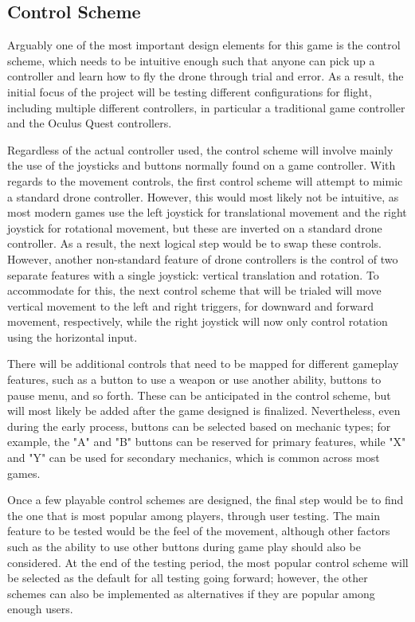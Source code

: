 \documentclass[10pt,twocolumn]{article}
\begin{document}
\subsection{Control Scheme}

Arguably one of the most important design elements for this game is the control scheme, which needs to be intuitive enough such that anyone can pick up a controller and learn how to fly the drone through trial and error. As a result, the initial focus of the project will be testing different configurations for flight, including multiple different controllers, in particular a traditional game controller and the Oculus Quest controllers. 

Regardless of the actual controller used, the control scheme will involve mainly the use of the joysticks and buttons normally found on a game controller. With regards to the movement controls, the first control scheme will attempt to mimic a standard drone controller. However, this would most likely not be intuitive, as most modern games use the left joystick for translational movement and the right joystick for rotational movement, but these are inverted on a standard drone controller. As a result, the next logical step would be to swap these controls. However, another non-standard feature of drone controllers is the control of two separate features with a single joystick: vertical translation and rotation. To accommodate for this, the next control scheme that will be trialed will move vertical movement to the left and right triggers, for downward and forward movement, respectively, while the right joystick will now only control rotation using the horizontal input. 

There will be additional controls that need to be mapped for different gameplay features, such as a button to use a weapon or use another ability, buttons to pause menu, and so forth. These can be anticipated in the control scheme, but will most likely be added after the game designed is finalized. Nevertheless, even during the early process, buttons can be selected based on mechanic types; for example, the "A" and "B" buttons can be reserved for primary features, while "X" and "Y" can be used for secondary mechanics, which is common across most games. 

Once a few playable control schemes are designed, the final step would be to find the one that is most popular among players, through user testing. The main feature to be tested would be the feel of the movement, although other factors such as the ability to use other buttons during game play should also be considered. At the end of the testing period, the most popular control scheme will be selected as the default for all testing going forward; however, the other schemes can also be implemented as alternatives if they are popular among enough users.
\end{document}
